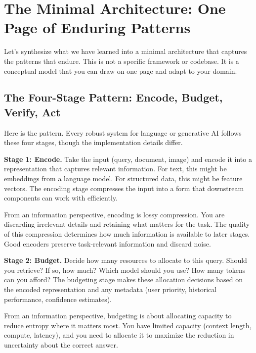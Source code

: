 \vspace{2em}

\section{The Minimal Architecture: One Page of Enduring Patterns}

Let's synthesize what we have learned into a minimal architecture that captures the patterns that endure. This is not a specific framework or codebase. It is a conceptual model that you can draw on one page and adapt to your domain.

\vspace{1em}

\subsection{The Four-Stage Pattern: Encode, Budget, Verify, Act}

Here is the pattern. Every robust system for language or generative AI follows these four stages, though the implementation details differ.

\textbf{Stage 1: Encode.} Take the input (query, document, image) and encode it into a representation that captures relevant information. For text, this might be embeddings from a language model. For structured data, this might be feature vectors. The encoding stage compresses the input into a form that downstream components can work with efficiently.

From an information perspective, encoding is lossy compression. You are discarding irrelevant details and retaining what matters for the task. The quality of this compression determines how much information is available to later stages. Good encoders preserve task-relevant information and discard noise.

\textbf{Stage 2: Budget.} Decide how many resources to allocate to this query. Should you retrieve? If so, how much? Which model should you use? How many tokens can you afford? The budgeting stage makes these allocation decisions based on the encoded representation and any metadata (user priority, historical performance, confidence estimates).

From an information perspective, budgeting is about allocating capacity to reduce entropy where it matters most. You have limited capacity (context length, compute, latency), and you need to allocate it to maximize the reduction in uncertainty about the correct answer.

